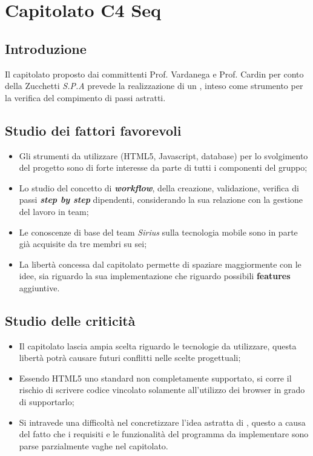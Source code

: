 \section{Capitolato C4 Seq}
\subsection{Introduzione}
Il capitolato proposto dai committenti Prof. Vardanega e Prof. Cardin per conto della Zucchetti \textit{S.P.A} prevede la realizzazione di un \progetto , inteso come strumento per la verifica del compimento di passi astratti.
\subsection{Studio dei fattori favorevoli}
\begin{itemize}
\item Gli strumenti da utilizzare (HTML5, Javascript, database) per lo svolgimento del progetto sono di forte interesse da parte di tutti i componenti del gruppo;
\item Lo studio del concetto di \textbf{\textit{workflow}}, della creazione, validazione, verifica di passi \textbf{\textit{step by step}} dipendenti, considerando la sua relazione con la gestione del lavoro in team;
\item Le conoscenze di base del team \textit{Sirius} sulla tecnologia mobile sono in parte già acquisite da tre membri su sei;
\item La libertà concessa dal capitolato permette di spaziare maggiormente con le idee, sia riguardo la sua implementazione che riguardo possibili \textbf{features} aggiuntive.
\end{itemize}
\subsection{Studio delle criticità}
\begin{itemize}
\item Il capitolato lascia ampia scelta riguardo le tecnologie da utilizzare, questa libertà potrà causare futuri conflitti nelle scelte progettuali;
\item Essendo HTML5 uno standard non completamente supportato, si corre il rischio di scrivere codice vincolato solamente all'utilizzo dei browser in grado di supportarlo;
\item Si intravede una difficoltà nel concretizzare l'idea astratta di \progetto , questo a causa del fatto che i requisiti e le funzionalità del programma da implementare sono parse parzialmente vaghe nel capitolato.
\end{itemize}

